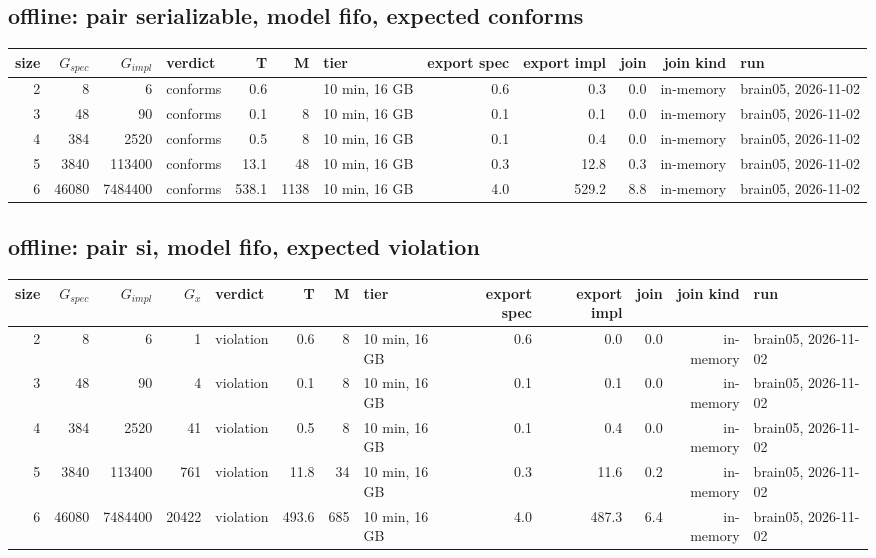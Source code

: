 \documentclass[10pt]{article}
\begin{document}
\subsection*{offline: pair \textsf{serializable}, model fifo, expected conforms}
\begin{longtable}{@{}rrrlrrlrrrrl@{}}
\toprule
size & $G_{\mathit{spec}}$ & $G_{\mathit{impl}}$ & verdict & T & M & tier & export spec & export impl & join & join kind & run \\
\midrule
\endhead
\color{red} 2 & 8 & 6 & conforms & 0.6 &  & 10 min, 16 GB & 0.6 & 0.3 & 0.0 & in-memory & brain05, 2026-11-02 \\
\color{red} 3 & 48 & 90 & conforms & 0.1 & 8 & 10 min, 16 GB & 0.1 & 0.1 & 0.0 & in-memory & brain05, 2026-11-02 \\
\color{red} 4 & 384 & 2520 & conforms & 0.5 & 8 & 10 min, 16 GB & 0.1 & 0.4 & 0.0 & in-memory & brain05, 2026-11-02 \\
\color{red} 5 & 3840 & 113400 & conforms & 13.1 & 48 & 10 min, 16 GB & 0.3 & 12.8 & 0.3 & in-memory & brain05, 2026-11-02 \\
\color{red} 6 & 46080 & 7484400 & conforms & 538.1 & 1138 & 10 min, 16 GB & 4.0 & 529.2 & 8.8 & in-memory & brain05, 2026-11-02 \\
\bottomrule
\end{longtable}
\subsection*{offline: pair \textsf{si}, model fifo, expected violation}
\begin{longtable}{@{}rrrrlrrlrrrrl@{}}
\toprule
size & $G_{\mathit{spec}}$ & $G_{\mathit{impl}}$ & $G_x$ & verdict & T & M & tier & export spec & export impl & join & join kind & run \\
\midrule
\endhead
\color{red} 2 & 8 & 6 & 1 & violation & 0.6 & 8 & 10 min, 16 GB & 0.6 & 0.0 & 0.0 & in-memory & brain05, 2026-11-02 \\
\color{red} 3 & 48 & 90 & 4 & violation & 0.1 & 8 & 10 min, 16 GB & 0.1 & 0.1 & 0.0 & in-memory & brain05, 2026-11-02 \\
\color{red} 4 & 384 & 2520 & 41 & violation & 0.5 & 8 & 10 min, 16 GB & 0.1 & 0.4 & 0.0 & in-memory & brain05, 2026-11-02 \\
\color{red} 5 & 3840 & 113400 & 761 & violation & 11.8 & 34 & 10 min, 16 GB & 0.3 & 11.6 & 0.2 & in-memory & brain05, 2026-11-02 \\
\color{red} 6 & 46080 & 7484400 & 20422 & violation & 493.6 & 685 & 10 min, 16 GB & 4.0 & 487.3 & 6.4 & in-memory & brain05, 2026-11-02 \\
\bottomrule
\end{longtable}
\end{document}
